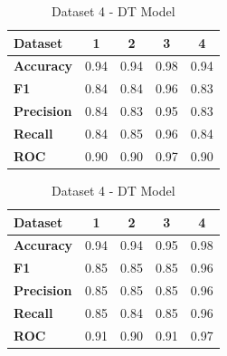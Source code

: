 \begin{table}[H]
\begin{subtable}[H]{0.45\textwidth}
\begin{tabular}{|l|c|c|c|c|}
            \hline
            \textbf{Dataset} & \textbf{1} & \textbf{2} & \textbf{3} & \textbf{4} \\
            \hline
            \textbf{Accuracy} & 0.94 & 0.94 & 0.98 & 0.94 \\
            \textbf{F1} & 0.84 & 0.84 & 0.96 & 0.83 \\
            \textbf{Precision} & 0.84 & 0.83 & 0.95 & 0.83 \\
            \textbf{Recall} & 0.84 & 0.85 & 0.96 & 0.84 \\
            \textbf{ROC} & 0.90 & 0.90 & 0.97 & 0.90 \\
            \hline
        \end{tabular}
        \caption{Dataset 3 - DT Model}\label{subtab:dataset_3_dt_model}
    \end{subtable}
    \quad
    \begin{subtable}[H]{0.45\textwidth}
        \centering
        \begin{tabular}{|l|c|c|c|c|}
            \hline
            \textbf{Dataset} & \textbf{1} & \textbf{2} & \textbf{3} & \textbf{4} \\
            \hline
            \textbf{Accuracy} & 0.94 & 0.94 & 0.95 & 0.98 \\
            \textbf{F1} & 0.85 & 0.85 & 0.85 & 0.96 \\
            \textbf{Precision} & 0.85 & 0.85 & 0.85 & 0.96 \\
            \textbf{Recall} & 0.85 & 0.84 & 0.85 & 0.96 \\
            \textbf{ROC} & 0.91 & 0.90 & 0.91 & 0.97 \\
            \hline
        \end{tabular}
        \caption{Dataset 4 - DT Model}\label{subtab:dataset_4_dt_model}
    \end{subtable}
\end{table}

